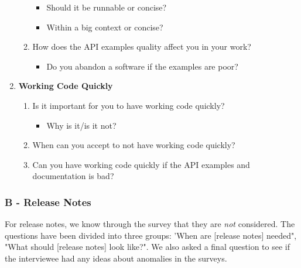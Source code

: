 \documentclass{cslthse-msc}
\begin{document}
\begin{enumerate}[label={A\Alph*}]
\begin{enumerate}[label={AC\arabic*}]
\begin{itemize}[label={-}]
                \item Should it be runnable or concise?
                \item Within a big context or concise?
            \end{itemize}
            \item	How does the API examples quality affect you in your work?
            \begin{itemize}[label={-}]
                \item Do you abandon a software if the examples are poor?
            \end{itemize}
        \end{enumerate}

        \item\textbf{Working Code Quickly}
        \begin{enumerate}[label={AD\arabic*}]
            \item Is it important for you to have working code quickly?
            \begin{itemize}[label={-}]
                \item Why is it/is it not?
            \end{itemize}
            \item When can you accept to not have working code quickly?
            \item Can you have working code quickly if the API examples and documentation is bad?
        \end{enumerate}
    \end{enumerate}

    \subsubsection{B - Release Notes}
    For release notes, we know through the survey that they are \textit{not} considered.
    The questions have been divided into three groups: 'When are [release notes] needed",
    "What should [release notes] look like?". We also asked a final question to see if the interviewee had any ideas about anomalies in the surveys.
\end{document}
